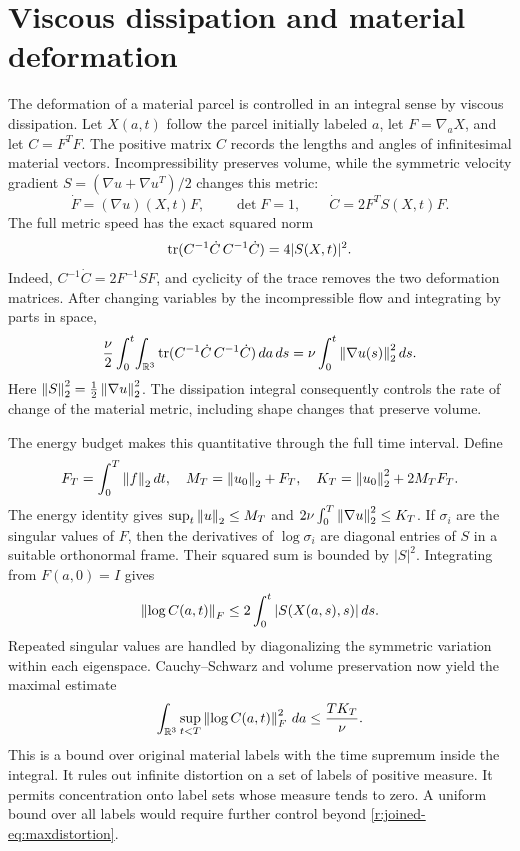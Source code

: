 \section{Viscous dissipation and material deformation}\label{r:joined-sec:metric}

The deformation of a material parcel is controlled in an integral
sense by viscous dissipation. Let $X(a,t)$ follow the parcel initially labeled $a$, let $F=\nabla_aX$, and let $C=F^TF$. The positive matrix $C$ records the lengths and angles of infinitesimal material vectors. Incompressibility preserves volume, while the symmetric velocity gradient $S=(\nabla u+\nabla u^T)/2$ changes this metric:
\begin{equation}\label{r:joined-eq:metric}
\dot F=(\nabla u)(X,t)F,\qquad
\det F=1,\qquad
\dot C=2F^TS(X,t)F.
\end{equation}
The full metric speed has the exact squared norm
\begin{equation}\label{r:joined-eq:metricspeed}
\operatorname{tr}(C^{-1}\dot C\,C^{-1}\dot C)=4|S(X,t)|^2.
\end{equation}
Indeed, $C^{-1}\dot C=2F^{-1}SF$, and cyclicity of the trace removes the two deformation matrices. After changing variables by the incompressible flow and integrating by parts in space,
\begin{equation}\label{r:joined-eq:metricaction}
\frac\nu2\int_0^t\!\int_{\mathbb R^3}
\operatorname{tr}(C^{-1}\dot C\,C^{-1}\dot C)\,da\,ds
=\nu\int_0^t\left\lVert \nabla u(s)\right\rVert_2^2ds.
\end{equation}
Here $\left\lVert S\right\rVert_2^2=\frac12\left\lVert \nabla u\right\rVert_2^2$. The dissipation integral consequently controls the rate of change
of the material metric, including shape changes that preserve volume.

The energy budget makes this quantitative through the full time interval. Define
\begin{equation*}
F_T=\int_0^T\left\lVert f\right\rVert_2dt,\quad
M_T=\left\lVert u_0\right\rVert_2+F_T,\quad
K_T=\left\lVert u_0\right\rVert_2^2+2M_TF_T.
\end{equation*}
The energy identity gives $\sup_t\left\lVert u\right\rVert_2\le M_T$ and
$2\nu\int_0^T\left\lVert \nabla u\right\rVert_2^2\le K_T$.
If $\sigma_i$ are the singular values of $F$, then the derivatives of $\log\sigma_i$ are diagonal entries of $S$ in a suitable orthonormal frame. Their squared sum is bounded by $|S|^2$. Integrating from $F(a,0)=I$ gives
\begin{equation*}
\left\lVert \log C(a,t)\right\rVert_F\le2\int_0^t|S(X(a,s),s)|\,ds.
\end{equation*}
Repeated singular values are handled by diagonalizing the symmetric variation within each eigenspace. Cauchy--Schwarz and volume preservation now yield the maximal estimate
\begin{equation}\label{r:joined-eq:maxdistortion}
\int_{\mathbb R^3}\sup_{t<T}\left\lVert \log C(a,t)\right\rVert_F^2\,da
\le\frac{TK_T}{\nu}.
\end{equation}
This is a bound over original material labels with the time supremum inside the integral. It rules out infinite distortion on a set of labels of positive measure. It permits concentration onto label sets whose measure tends to zero. A uniform bound over all labels would require further control beyond \eqref{r:joined-eq:maxdistortion}.

